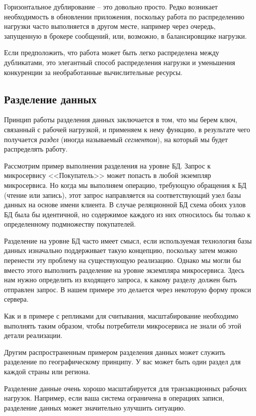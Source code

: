 \documentclass[%
	11pt,
	a4paper,
	utf8,
		]{article}
\begin{document}
Горизонтальное дублирование -- это довольно просто. Редко возникает необходимость в обновлении приложения, поскольку работа по распределению нагрузки часто выполняется в другом месте, например через очередь, запущенную в брокере сообщений, или, возможно, в балансировщике нагрузки.

Если предположить, что работа может быть легко распределена между дубликатами, это элегантный способ распределения нагрузки и уменьшения конкуренции за необработанные вычислительные ресурсы.

\subsection{Разделение данных}

Принцип работы разделения данных заключается в том, что мы берем ключ, связанный с рабочей нагрузкой, и применяем к нему функцию, в результате чего получается \emph{раздел} (иногда называемый \emph{сегментом}), на который мы будет распределять работу.

Рассмотрим пример выполнения разделения на уровне БД. Запрос к микросервису <<Покупатель>> может попасть в любой экземпляр микросервиса. Но когда мы выполняем операцию, требующую обращения к БД (чтение или запись), этот запрос направляется на соответствующий узел базы данных на основе имени клиента. В случае реляционной БД схема обоих узлов БД была бы идентичной, но содержимое каждого из них относилось бы только к определенному подмножеству покупателей.

Разделение на уровне БД часто имеет смысл, если используемая технология базы данных изначально поддерживает такую концепцию, поскольку затем можно перенести эту проблему на существующую реализацию. Однако мы могли бы вместо этого выполнить разделение на уровне экземпляра микросервиса. Здесь нам нужно определить из входящего запроса, к какому разделу должен быть отправлен запрос. В нашем примере это делается через некоторую форму прокси сервера. 

Как и в примере с репликами для считывания, масштабирование необходимо выполнять таким образом, чтобы потребители микросервиса не знали об этой детали реализации.

Другим распространенным примером разделения данных может служить разделение по географическому принципу. У вас может быть один раздел для каждой страны или региона.

Разделение данные очень хорошо масштабируется для транзакционных рабочих нагрузок. Например, если ваша система ограничена в операциях записи, разделение данных может значительно улучшить ситуацию.
\end{document}
